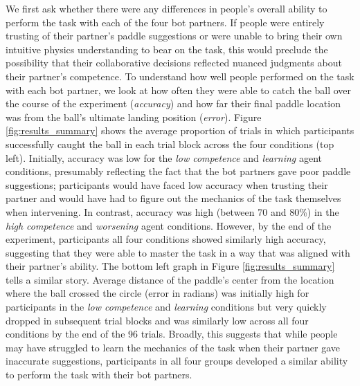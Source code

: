 \documentclass[10pt,letterpaper]{article}
\begin{document}
We first ask whether there were any differences in people's overall ability to perform the task with each of the four bot partners. If people were entirely trusting of their partner's paddle suggestions or were unable to bring their own intuitive physics understanding to bear on the task, this would preclude the possibility that their collaborative decisions reflected nuanced judgments about their partner's competence. To understand how well people performed on the task with each bot partner, we look at how often they were able to catch the ball over the course of the experiment (\textit{accuracy}) and how far their final paddle location was from the ball's ultimate landing position (\textit{error}). Figure \ref{fig:results_summary} shows the average proportion of trials in which participants successfully caught the ball in each trial block across the four conditions (top left). Initially, accuracy was low for the \textit{low competence} and \textit{learning} agent conditions, presumably reflecting the fact that the bot partners gave poor paddle suggestions; participants would have faced low accuracy when trusting their partner and would have had to figure out the mechanics of the task themselves when intervening. In contrast, accuracy was high (between 70 and 80\%) in the \textit{high competence} and \textit{worsening} agent conditions. However, by the end of the experiment, participants all four conditions showed similarly high accuracy, suggesting that they were able to master the task in a way that was aligned with their partner's ability. The bottom left graph in Figure \ref{fig:results_summary} tells a similar story. Average distance of the paddle's center from the location where the ball crossed the circle (error in radians) was initially high for participants in the \textit{low competence} and \textit{learning} conditions but very quickly dropped in subsequent trial blocks and was similarly low across all four conditions by the end of the 96 trials. Broadly, this suggests that while people may have struggled to learn the mechanics of the task when their partner gave inaccurate suggestions, participants in all four groups developed a similar ability to perform the task with their bot partners. 
\end{document}
